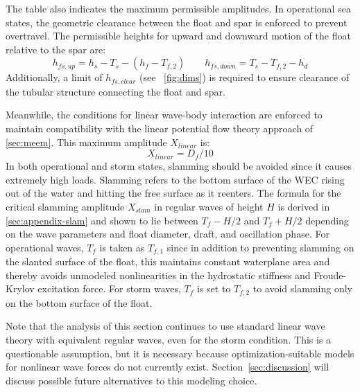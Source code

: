 The table also indicates the maximum permissible amplitudes.
In operational sea states, the geometric clearance between the float and spar is enforced to prevent overtravel.
The permissible heights for upward and downward motion of the float relative to the spar are:
\begin{equation}\label{eq:h-fs-up-down}
    h_{fs,up} = h_s - T_s - (h_f- T_{f,2})\qquad h_{fs,down} = T_s - T_{f,2} - h_d
\end{equation}
Additionally, a limit of $h_{fs,clear}$ (see \figureautorefname~\ref{fig:dims}) is required to ensure clearance of the tubular structure connecting the float and spar.

Meanwhile, the conditions for linear wave-body interaction are enforced to maintain compatibility with the linear potential flow theory approach of \ref{sec:meem}.
This maximum amplitude $X_{linear}$ is:
\begin{equation}
    X_{linear}  =D_f/10
\end{equation}
In both operational and storm states, slamming should be avoided since it causes extremely high loads.
Slamming refers to the bottom surface of the WEC rising out of the water and hitting the free surface as it reenters.
The formula for the critical slamming amplitude $X_{slam}$ in regular waves of height $H$ is derived in \appendixname \ref{sec:appendix-slam} and shown to lie between $T_f-H/2$ and $T_f+H/2$ depending on the wave parameters and float diameter, draft, and oscillation phase.
For operational waves, $T_f$ is taken as $T_{f,1}$ since in addition to preventing slamming on the slanted surface of the float, this maintains constant waterplane area and thereby avoids unmodeled nonlinearities in the hydrostatic stiffness and Froude-Krylov excitation force.
For storm waves, $T_f$ is set to $T_{f,2}$ to avoid slamming only on the bottom surface of the float.

Note that the analysis of this section continues to use standard linear wave theory with equivalent regular waves, even for the storm condition.
This is a questionable assumption, but it is necessary because optimization-suitable models for nonlinear wave forces do not currently exist.
Section~\ref{sec:discussion} will discuss possible future alternatives to this modeling choice.


